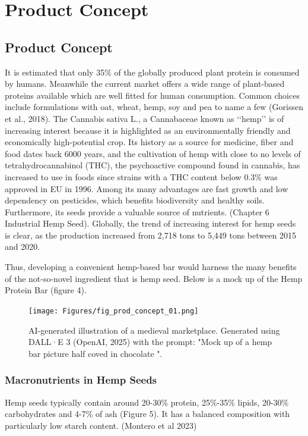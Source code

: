 \chapter{Product Concept}
\setlength{\headheight}{22.94003pt}
\addtolength{\topmargin}{-10.22661pt}

\section{Product Concept}
It is estimated that only 35\% of the globally produced plant protein is consumed by humans. Meanwhile the current market offers a wide range of plant-based proteins available which are well fitted for human consumption. Common choices include formulations with oat, wheat, hemp, soy and pea to name a few (Gorissen et al., 2018). The Cannabis sativa L., a Cannabaceae known as ‘‘hemp’’ is of increasing interest because it is highlighted as an environmentally friendly and economically high-potential crop. Its history as a source for medicine, fiber and food dates back 6000 years, and the cultivation of hemp with close to no levels of tetrahydrocannabinol (THC), the psychoactive compound found in cannabis, has increased to use in foods since strains with a THC content below 0.3\% was approved in EU in 1996. Among its many advantages are fast growth and low dependency on pesticides, which benefits biodiversity and healthy soils. Furthermore, its seeds provide a valuable source of nutrients. (Chapter 6 Industrial Hemp Seed). Globally, the trend of increasing interest for hemp seeds is clear, as the production increased from 2,718 tons to 5,449 tons between 2015 and 2020. 

\vspace{1em}
Thus, developing a convenient hemp-based bar would harness the many benefits of the not-so-novel ingredient that is hemp seed. Below is a mock up of the Hemp Protein Bar (figure 4).

\begin{figure}[H]
    \centering
    \texttt{[image: Figures/fig\_prod\_concept\_01.png]}
    \caption{AI-generated illustration of a medieval marketplace. Generated using DALL·E 3 (OpenAI, 2025) with the prompt: "Mock up of a hemp bar picture half coved in chocolate ".}
    \label{fig:prod_concept_01}
\end{figure}


\subsection{Macronutrients in Hemp Seeds}
Hemp seeds typically contain around 20-30\% protein, 25\%-35\% lipids, 20-30\% carbohydrates and 4-7\% of ash (Figure 5). It has a balanced composition with particularly low starch content. (Montero et al 2023) 

